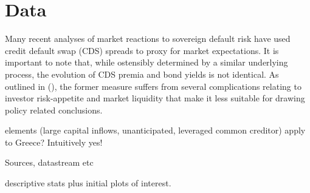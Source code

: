 \documentclass[/../base.tex]{subfiles}
\begin{document}
\section{Data}
\label{data}

Many recent analyses of market reactions to sovereign default risk have used credit default swap (CDS) spreads to proxy for market expectations. It is important to note that, while ostensibly determined by a similar underlying process, the evolution of CDS premia and bond yields is not identical. As outlined in  (\cite{fontana2010analysis}), the former measure suffers from several complications relating to investor risk-appetite and market liquidity that make it less suitable for drawing policy related conclusions.

\cite{kaminsky2003unholy} elements (large capital inflows, unanticipated, leveraged common creditor) apply to Greece? Intuitively yes!


Sources, datastream etc


descriptive stats plus initial plots of interest.
\end{document}

